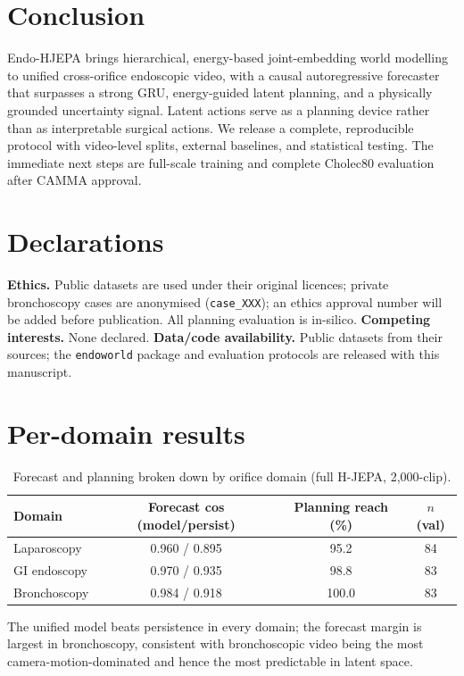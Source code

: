 \documentclass[final,3p,times,twocolumn]{elsarticle}
\begin{document}
\section{Conclusion}
Endo-HJEPA brings hierarchical, energy-based joint-embedding world modelling to unified cross-orifice endoscopic video, with a causal autoregressive forecaster that surpasses a strong GRU, energy-guided latent planning, and a physically grounded uncertainty signal. Latent actions serve as a planning device rather than as interpretable surgical actions. We release a complete, reproducible protocol with video-level splits, external baselines, and statistical testing. The immediate next steps are full-scale training and complete Cholec80 evaluation after CAMMA approval.

\section*{Declarations}
\textbf{Ethics.} Public datasets are used under their original licences; private bronchoscopy cases are anonymised (\texttt{case\_XXX}); an ethics approval number will be added before publication. All planning evaluation is in-silico. \textbf{Competing interests.} None declared. \textbf{Data/code availability.} Public datasets from their sources; the \texttt{endoworld} package and evaluation protocols are released with this manuscript.

\appendix
\section{Per-domain results}
\begin{table}[h]
\centering
\caption{Forecast and planning broken down by orifice domain (full H-JEPA, 2,000-clip).}
\label{tab:perdomain}
\small
\begin{tabular}{lccc}
\toprule
Domain & Forecast cos (model/persist) & Planning reach (\%) & $n$ (val) \\
\midrule
Laparoscopy & 0.960 / 0.895 & 95.2 & 84 \\
GI endoscopy & 0.970 / 0.935 & 98.8 & 83 \\
Bronchoscopy & 0.984 / 0.918 & 100.0 & 83 \\
\bottomrule
\end{tabular}
\end{table}

The unified model beats persistence in every domain; the forecast margin is largest in bronchoscopy, consistent with bronchoscopic video being the most camera-motion-dominated and hence the most predictable in latent space.
\end{document}
